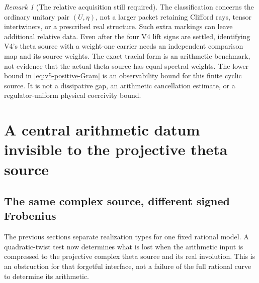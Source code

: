 \documentclass[11pt]{article}
\theoremstyle{definition}
\theoremstyle{remark}
\newtheorem{remark}[remark]{Remark}
\begin{document}
\begin{remark}[The relative acquisition still required]
The classification concerns the ordinary unitary pair $(U,\eta)$, not a
larger packet retaining Clifford rays, tensor intertwiners, or a prescribed
real structure. Such extra markings can leave additional relative data.
Even after the four V4 lift signs are settled, identifying V4's theta
source with a weight-one carrier needs an independent comparison map and
its source weights. The exact tracial form is an arithmetic benchmark,
not evidence that the actual theta source has equal spectral weights.
The lower bound in \eqref{eq:v5-positive-Gram} is an observability bound
for this finite cyclic source. It is not a dissipative gap, an arithmetic
cancellation estimate, or a regulator-uniform physical coercivity bound.
\end{remark}

\section{A central arithmetic datum invisible to the projective theta source}
\label{sec:v5-twist}

\subsection{The same complex source, different signed Frobenius}
The previous sections separate realization types for one fixed rational
model. A quadratic-twist test now determines what is lost when the
arithmetic input is compressed to the projective complex theta source and
its real involution. This is an obstruction for that forgetful interface,
not a failure of the full rational curve to determine its arithmetic.
\end{document}
